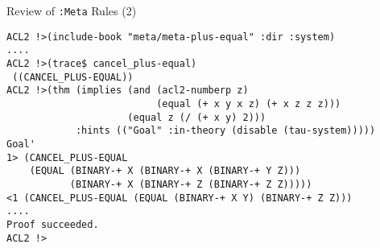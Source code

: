 \begin{frame}[fragile]{Review of {\tt :Meta} Rules (2)}

{\footnotesize
\begin{verbatim}
ACL2 !>(include-book "meta/meta-plus-equal" :dir :system)
....
ACL2 !>(trace$ cancel_plus-equal)
 ((CANCEL_PLUS-EQUAL))
ACL2 !>(thm (implies (and (acl2-numberp z)
                          (equal (+ x y x z) (+ x z z z)))
                     (equal z (/ (+ x y) 2)))
            :hints (("Goal" :in-theory (disable (tau-system)))))
Goal'
1> (CANCEL_PLUS-EQUAL
    (EQUAL (BINARY-+ X (BINARY-+ X (BINARY-+ Y Z)))
           (BINARY-+ X (BINARY-+ Z (BINARY-+ Z Z)))))
<1 (CANCEL_PLUS-EQUAL (EQUAL (BINARY-+ X Y) (BINARY-+ Z Z)))
....
Proof succeeded.
ACL2 !>
\end{verbatim}
}

\end{frame}
